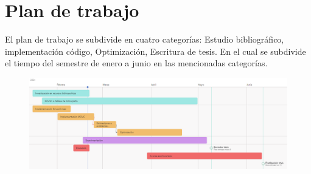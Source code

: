 \documentclass{article}
\begin{document}
\section{Plan de trabajo}

El plan de trabajo se subdivide en cuatro categorías: Estudio bibliográfico, implementación código, Optimización, Escritura de tesis. En el cual se subdivide el tiempo del semestre de enero a junio en las mencionadas categorías.

\begin{figure}
    \centering 
    \includegraphics[width = 15 cm]{Figures/cronograma.png} 
\end{figure} 


\newpage























\end{document}

